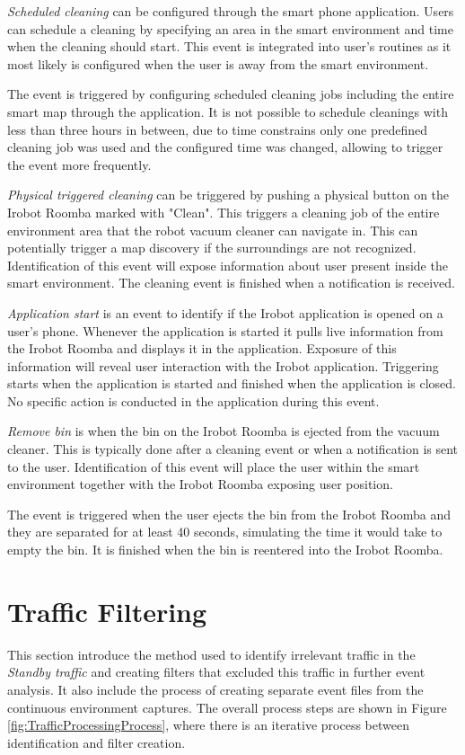 \textit{Scheduled cleaning} can be configured through the smart phone application. Users can schedule a cleaning by specifying an area in the smart environment and time when the cleaning should start. This event is integrated into user's routines as it most likely is configured when the user is away from the smart environment.

The event is triggered by configuring scheduled cleaning jobs including the entire smart map through the application. It is not possible to schedule cleanings with less than three hours in between, due to time constrains only one predefined cleaning job was used and the configured time was changed, allowing to trigger the event more frequently.

\textit{Physical triggered cleaning} can be triggered by pushing a physical button on the Irobot Roomba marked with "Clean". This triggers a cleaning job of the entire environment area that the robot vacuum cleaner can navigate in. This can potentially trigger a map discovery if the surroundings are not recognized. Identification of this event will expose information about user present inside the smart environment. The cleaning event is finished when a notification is received. 

\textit{Application start} is an event to identify if the Irobot application is opened on a user's phone. Whenever the application is started it pulls live information from the Irobot Roomba and displays it in the application. Exposure of this information will reveal user interaction with the Irobot application. Triggering starts when the application is started and finished when the application is closed. No specific action is conducted in the application during this event. 

\textit{Remove bin} is when the bin on the Irobot Roomba is ejected from the vacuum cleaner. This is typically done after a cleaning event or when a notification is sent to the user. Identification of this event will place the user within the smart environment together with the Irobot Roomba exposing user position. 

The event is triggered when the user ejects the bin from the Irobot Roomba and they are separated for at least 40 seconds, simulating the time it would take to empty the bin. It is finished when the bin is reentered into the Irobot Roomba. 

\section{Traffic Filtering}
This section introduce the method used to identify irrelevant traffic in the \textit{Standby traffic} and creating filters that excluded this traffic in further event analysis. It also include the process of creating separate event files from the continuous environment captures. The overall process steps are shown in Figure \ref{fig:TrafficProcessingProcess}, where there is an iterative process between identification and filter creation.


